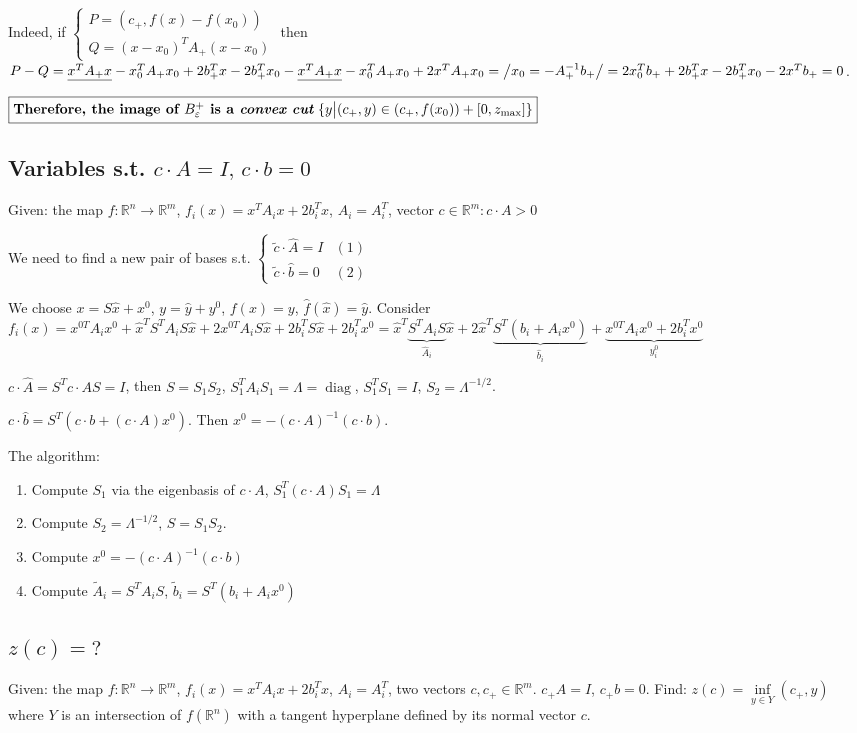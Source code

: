 \documentclass[a4paper]{article}
\DeclareMathOperator{\diag}{diag}
\begin{document}
Indeed, if $\begin{cases}
P=(c_+,f(x)-f(x_0))\\
Q=(x-x_0)^TA_+(x-x_0)
\end{cases}$
then $P-Q=\underline{x^TA_+x}-x_0^TA_+x_0+2b_+^Tx-2b_+^Tx_0-\underline{x^TA_+x}-x_0^TA_+x_0+2x^TA_+x_0=\left/x_0=-A_+^{-1}b_+\right/=2x_0^Tb_++2b_+^Tx-2b_+^Tx_0-2x^Tb_+=0$.

$\boxed{\mbox{{\bf Therefore, the image of $B_\varepsilon^+$ is a {\em convex cut}} $\{y\big| (c_+,y)\in (c_+,f(x_0))+[0,z_{\max}]\}$}}$

\subsection{Variables s.t. $c\cdot A=I,\,c\cdot b=0$}
\label{variables}
Given: the map $f\colon\mathbb{R}^n\to\mathbb{R}^m$, $f_i(x)=x^TA_ix+2b_i^Tx$, $A_i=A_i^T$, vector $c\in\mathbb{R}^m\colon c\cdot A>0$

We need to find a new pair of bases s.t. $\begin{cases}
\tilde{c}\cdot \hat{A}=I & (1)\\
\tilde{c}\cdot \hat{b}=0 & (2)
\end{cases}$

We choose $x=S\hat{x}+x^0$, $y=\hat{y}+y^0$, $f(x)=y$, $\hat{f}(\hat{x})=\hat{y}$.
Consider $f_i(x)=x^{0T}A_ix^0+\hat{x}^TS^TA_iS\hat{x}+2x^{0T}A_iS\hat{x}+2b_i^TS\hat{x}+2b_i^Tx^0=\hat{x}^T\underbrace{S^TA_iS}_{\hat{A}_i}\hat{x}+2\hat{x}^T\underbrace{S^T(b_i+A_ix^0)}_{\hat{b}_i}+\underbrace{x^{0T}A_ix^0+2b_i^Tx^0}_{y^0_i}$

$c\cdot \hat{A}=S^Tc\cdot AS=I$, then $S=S_1S_2$, $S_1^TA_iS_1=\Lambda=\diag$, $S_1^TS_1=I$, $S_2=\Lambda^{-1/2}$.

$c\cdot \hat{b}=S^T(c\cdot b+(c\cdot A)x^0)$. Then $x^0=-(c\cdot A)^{-1}(c\cdot b)$.

The algorithm:
\begin{enumerate}
\item Compute $S_1$ via the eigenbasis of $c\cdot A$, $S_1^T(c\cdot A)S_1=\Lambda$
\item Compute $S_2=\Lambda^{-1/2}$, $S=S_1S_2$.
\item Compute $x^0=-(c\cdot A)^{-1}(c\cdot b)$
\item Compute $\tilde{A}_i=S^TA_iS$, $\tilde{b}_i=S^T(b_i+A_ix^0)$
\end{enumerate}
\subsection{$z(c)=?$}
Given: the map $f\colon\mathbb{R}^n\to\mathbb{R}^m$, $f_i(x)=x^TA_ix+2b_i^Tx$, $A_i=A_i^T$, two vectors $c,c_+\in\mathbb{R}^m$. $c_+A=I$, $c_+b=0$.
Find: $z(c)=\inf\limits_{y\in Y} (c_+, y)$ where $Y$ is an intersection of $f(\mathbb{R}^n)$ with a tangent hyperplane defined by its normal vector $c$.
\end{document}
